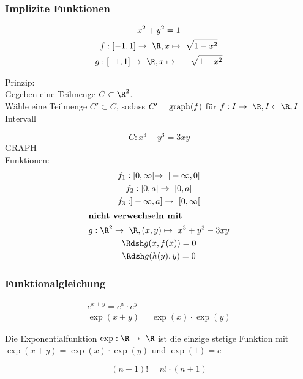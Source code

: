 \subsubsection{Implizite Funktionen}
\begin{bsp*}
	\begin{gather*}
		x^2 + y^2 = 1 \\
		f: [-1,1] \rightarrow \R , x \mapsto \sqrt{1-x^2} \\
		g: [-1,1] \rightarrow \R , x \mapsto -\sqrt{1-x^2}
	\end{gather*}
\end{bsp*}
Prinzip:\\
Gegeben eine Teilmenge $C \subset \R^2$.\\
Wähle eine Teilmenge $C' \subset C$, sodass $C' = \operatorname{graph}(f)$ für $f: I \rightarrow \R , I \subset \R , I$ Intervall\\
\begin{bsp*}
	\[ C: x^3 + y^3 = 3xy \]
	GRAPH\\
	Funktionen:
	\begin{gather*}
		f_1: [0,\infty[ \rightarrow ]-\infty,0] \\
		f_2: [0,a] \rightarrow [0,a] \\
		f_3: ]-\infty,a] \rightarrow [0,\infty[ \\
		\intertext{\textbf{nicht verwechseln mit}}
		g: \R^2 \rightarrow \R, (x,y) \mapsto x^3 + y^3 - 3xy \\
		\drsh g( x , f(x) ) = 0 \\
		\drsh g( h(y) , y ) = 0
	\end{gather*}
\end{bsp*}

\subsubsection{Funktionalgleichung}
\begin{bsp*}
	\begin{gather*}
		e^{x+y} = e^x \cdot e^y \\
		\exp(x+y) = \exp(x) \cdot \exp(y)
	\end{gather*}
\end{bsp*}
\begin{fakt}
	Die Exponentialfunktion $\exp: \R \rightarrow \R$ ist die einzige stetige Funktion mit $\exp(x+y) = \exp(x) \cdot \exp(y)$ und $\exp(1) = e$
\end{fakt}
\begin{bsp*}
	\[ (n+1)! = n! \cdot (n+1) \]
\end{bsp*}

